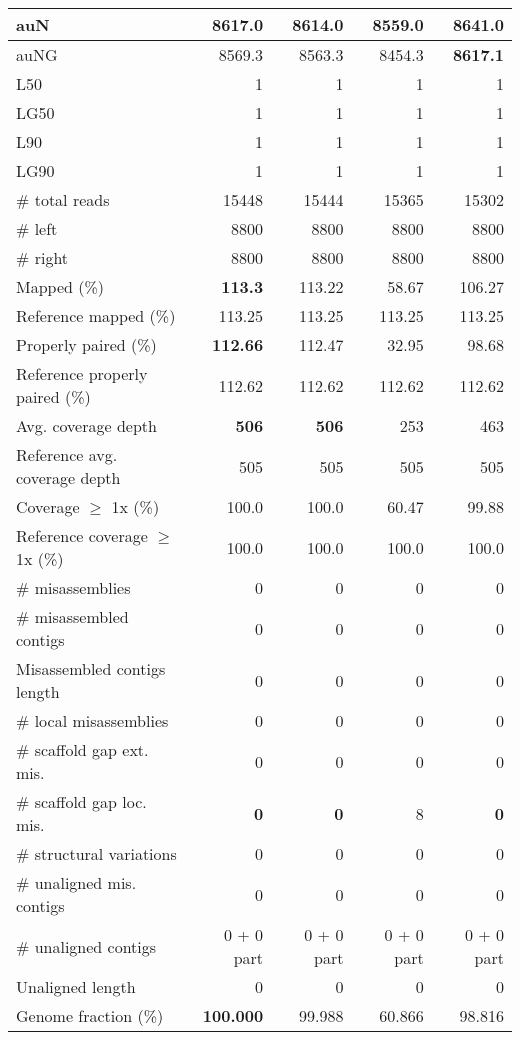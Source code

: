 \documentclass[12pt,a4paper]{article}
\begin{document}
\begin{table}[ht]
\begin{center}
\begin{tabular}{|l*{4}{|r}|}
auN & 8617.0 & 8614.0 & 8559.0 & {\bf 8641.0} \\ \hline
auNG & 8569.3 & 8563.3 & 8454.3 & {\bf 8617.1} \\ \hline
L50 & 1 & 1 & 1 & 1 \\ \hline
LG50 & 1 & 1 & 1 & 1 \\ \hline
L90 & 1 & 1 & 1 & 1 \\ \hline
LG90 & 1 & 1 & 1 & 1 \\ \hline
\# total reads & 15448 & 15444 & 15365 & 15302 \\ \hline
\# left & 8800 & 8800 & 8800 & 8800 \\ \hline
\# right & 8800 & 8800 & 8800 & 8800 \\ \hline
Mapped (\%) & {\bf 113.3} & 113.22 & 58.67 & 106.27 \\ \hline
Reference mapped (\%) & 113.25 & 113.25 & 113.25 & 113.25 \\ \hline
Properly paired (\%) & {\bf 112.66} & 112.47 & 32.95 & 98.68 \\ \hline
Reference properly paired (\%) & 112.62 & 112.62 & 112.62 & 112.62 \\ \hline
Avg. coverage depth & {\bf 506} & {\bf 506} & 253 & 463 \\ \hline
Reference avg. coverage depth & 505 & 505 & 505 & 505 \\ \hline
Coverage $\geq$ 1x (\%) & 100.0 & 100.0 & 60.47 & 99.88 \\ \hline
Reference coverage $\geq$ 1x (\%) & 100.0 & 100.0 & 100.0 & 100.0 \\ \hline
\# misassemblies & 0 & 0 & 0 & 0 \\ \hline
\# misassembled contigs & 0 & 0 & 0 & 0 \\ \hline
Misassembled contigs length & 0 & 0 & 0 & 0 \\ \hline
\# local misassemblies & 0 & 0 & 0 & 0 \\ \hline
\# scaffold gap ext. mis. & 0 & 0 & 0 & 0 \\ \hline
\# scaffold gap loc. mis. & {\bf 0} & {\bf 0} & 8 & {\bf 0} \\ \hline
\# structural variations & 0 & 0 & 0 & 0 \\ \hline
\# unaligned mis. contigs & 0 & 0 & 0 & 0 \\ \hline
\# unaligned contigs & 0 + 0 part & 0 + 0 part & 0 + 0 part & 0 + 0 part \\ \hline
Unaligned length & 0 & 0 & 0 & 0 \\ \hline
Genome fraction (\%) & {\bf 100.000} & 99.988 & 60.866 & 98.816 \\ \hline

\end{tabular}
\end{center}
\end{table}
\end{document}
